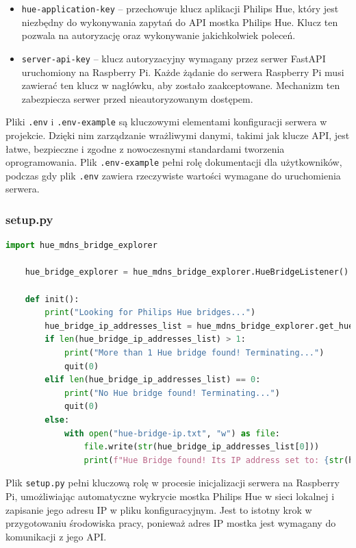 \documentclass[12pt]{article}
\begin{document}
\begin{itemize}
    \item \texttt{hue-application-key} – przechowuje klucz aplikacji Philips Hue, który jest niezbędny do wykonywania zapytań do API mostka Philips Hue. Klucz ten pozwala
          na autoryzację oraz wykonywanie jakichkolwiek poleceń.
    \item \texttt{server-api-key} – klucz autoryzacyjny wymagany przez serwer FastAPI uruchomiony na Raspberry Pi. Każde żądanie do serwera Raspberry Pi musi zawierać ten
          klucz w nagłówku, aby zostało zaakceptowane. Mechanizm ten zabezpiecza serwer przed nieautoryzowanym dostępem.
\end{itemize}
Pliki \texttt{.env} i \texttt{.env-example} są kluczowymi elementami konfiguracji serwera w projekcie. Dzięki nim zarządzanie wrażliwymi danymi, takimi jak klucze API,
jest łatwe, bezpieczne i zgodne z nowoczesnymi standardami tworzenia oprogramowania. Plik \texttt{.env-example} pełni rolę dokumentacji dla użytkowników, podczas gdy plik
\texttt{.env} zawiera rzeczywiste wartości wymagane do uruchomienia serwera.

\clearpage
\subsubsection{setup.py}
\begin{lstlisting}[language=Python]
    import hue_mdns_bridge_explorer
    
    hue_bridge_explorer = hue_mdns_bridge_explorer.HueBridgeListener()
    
    def init():
        print("Looking for Philips Hue bridges...")
        hue_bridge_ip_addresses_list = hue_mdns_bridge_explorer.get_hue_bridge_ips()
        if len(hue_bridge_ip_addresses_list) > 1:
            print("More than 1 Hue bridge found! Terminating...")
            quit(0)
        elif len(hue_bridge_ip_addresses_list) == 0:
            print("No Hue bridge found! Terminating...")
            quit(0)
        else:
            with open("hue-bridge-ip.txt", "w") as file:
                file.write(str(hue_bridge_ip_addresses_list[0]))
                print(f"Hue Bridge found! Its IP address set to: {str(hue_bridge_ip_addresses_list[0])}")
\end{lstlisting}
Plik \texttt{setup.py} pełni kluczową rolę w procesie inicjalizacji serwera na Raspberry Pi, umożliwiając automatyczne wykrycie mostka Philips Hue w sieci lokalnej i
zapisanie jego adresu IP w pliku konfiguracyjnym. Jest to istotny krok w przygotowaniu środowiska pracy, ponieważ adres IP mostka jest wymagany do komunikacji z jego API.
\end{document}
